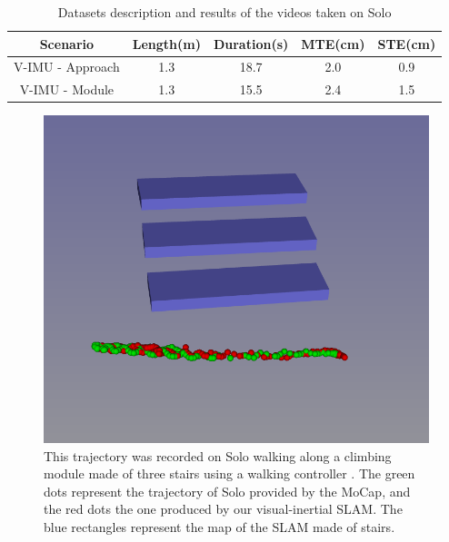 \begin{table}[h]
   \begin{center}
   \caption{Datasets description and results of the videos taken on Solo}
   \label{tab:solo}
    \begin{tabular}{|c|c|c|c|c|}
        \hline 
        Scenario  & Length(m) & Duration(s) & MTE(cm) & STE(cm) \\
        \hline 
         V-IMU - Approach & 1.3 & 18.7 & 2.0 & 0.9\\
        \hline 
         V-IMU - Module & 1.3 & 15.5 & 2.4 & 1.5 \\
        \hline
    \end{tabular}
    \end{center}
\end{table}

\begin{figure}[!ht]
  \centering
  \includegraphics[width=\linewidth]{figures/cosyslam/mapped_stairs.png}
  \caption{This trajectory was recorded on Solo walking along a climbing module made of three stairs using a walking controller \cite{leziart2021implementation}. 
  The green dots represent the trajectory of Solo provided by the MoCap, and the red dots the one produced by our visual-inertial SLAM. 
  The blue rectangles represent the map of the SLAM made of stairs.}
  \label{fig:map_stairs}
\end{figure}




